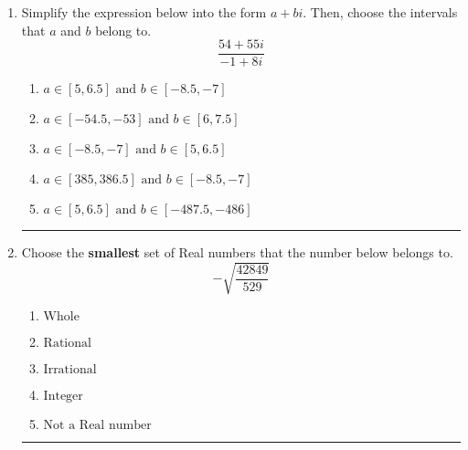 \documentclass[14pt]{extbook}
\newcommand{\litem}[1]{\item#1\hspace*{-1cm}\rule{\textwidth}{0.4pt}}
\begin{document}
\begin{enumerate}
{\begin{enumerate}[label=\Alph*.]
\end{enumerate} }
\litem{
Simplify the expression below into the form $a+bi$. Then, choose the intervals that $a$ and $b$ belong to.\[ \frac{54 + 55 i}{-1 + 8 i} \]\begin{enumerate}[label=\Alph*.]
\item \( a \in [5, 6.5] \text{ and } b \in [-8.5, -7] \)
\item \( a \in [-54.5, -53] \text{ and } b \in [6, 7.5] \)
\item \( a \in [-8.5, -7] \text{ and } b \in [5, 6.5] \)
\item \( a \in [385, 386.5] \text{ and } b \in [-8.5, -7] \)
\item \( a \in [5, 6.5] \text{ and } b \in [-487.5, -486] \)

\end{enumerate} }
\litem{
Choose the \textbf{smallest} set of Real numbers that the number below belongs to.\[ -\sqrt{\frac{42849}{529}} \]\begin{enumerate}[label=\Alph*.]
\item \( \text{Whole} \)
\item \( \text{Rational} \)
\item \( \text{Irrational} \)
\item \( \text{Integer} \)
\item \( \text{Not a Real number} \)

\end{enumerate} }
\end{enumerate}
\end{document}
